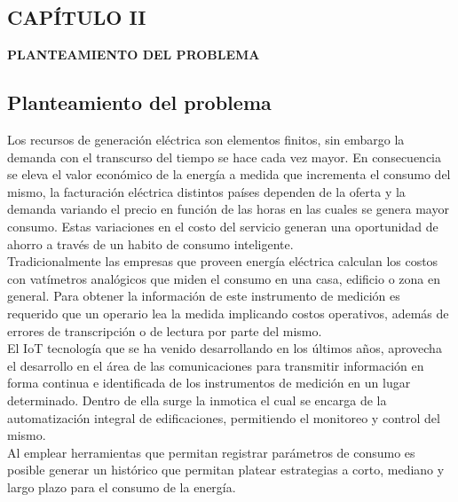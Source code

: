 \begin{center}
    \section*{CAPÍTULO II}
    \vspace*{0.5in}
    \textbf{PLANTEAMIENTO DEL PROBLEMA}
\end{center}

\subsection{Planteamiento del problema}

    Los recursos de generación eléctrica son elementos finitos, sin embargo la demanda con el transcurso del tiempo se 
    hace cada vez mayor. En consecuencia se eleva el valor económico de la energía a medida que incrementa el consumo del 
    mismo, la facturación eléctrica distintos países dependen de la oferta y la demanda variando el precio
    en función de las horas en las cuales se genera mayor consumo. Estas variaciones en el costo del servicio generan una 
    oportunidad de ahorro a través de un habito de consumo inteligente.\\
    
    Tradicionalmente las empresas que proveen energía eléctrica calculan los costos con vatímetros analógicos que miden el 
    consumo en una casa, edificio o zona en general. Para obtener la información de este instrumento de medición es 
    requerido que un operario lea la medida implicando costos operativos, además de errores de transcripción o de lectura
    por parte del mismo.\\

    El IoT tecnología que se ha venido desarrollando en los últimos años, aprovecha el desarrollo en el área de las 
    comunicaciones para transmitir información en forma continua e identificada de los instrumentos de medición en un
    lugar determinado. Dentro de ella surge la inmotica el cual se encarga de la automatización integral de
    edificaciones, permitiendo el monitoreo y control del mismo.\\
    
    Al emplear herramientas que permitan registrar parámetros de consumo es posible generar un histórico que permitan 
    platear estrategias a corto, mediano y largo plazo para el consumo de la energía.\\

